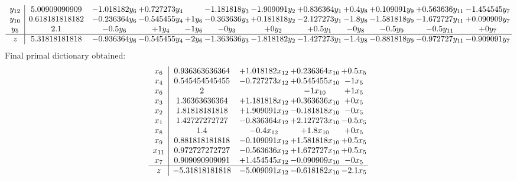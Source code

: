 \documentclass[11pt]{article}
\begin{document}
\[\begin{array}{c| c c@{\hskip 2pt} c@{\hskip 2pt} c@{\hskip 2pt} c@{\hskip 2pt} c@{\hskip 2pt} c@{\hskip 2pt} c@{\hskip 2pt} c@{\hskip 2pt} c@{\hskip 2pt} c@{\hskip 2pt} }
 y_{12}   &  5.00909090909 & -1.018182 y_{6} & + 0.727273 y_{4} &   & -1.181818 y_{3} & -1.909091 y_{2} & + 0.836364 y_{1} & + 0.4 y_{8} & + 0.109091 y_{9} & + 0.563636 y_{11} & -1.454545 y_{7}\\
 y_{10}   &  0.618181818182 & -0.236364 y_{6} & -0.545455 y_{4} & + 1 y_{6} & -0.363636 y_{3} & + 0.181818 y_{2} & -2.127273 y_{1} & -1.8 y_{8} & -1.581818 y_{9} & -1.672727 y_{11} & + 0.090909 y_{7}\\
 y_{5}   &  2.1 & -0.5 y_{6} & + 1 y_{4} & -1 y_{6} & -0 y_{3} & + 0 y_{2} & + 0.5 y_{1} & -0 y_{8} & -0.5 y_{9} & -0.5 y_{11} & + 0 y_{7}\\
\hline
z    &  5.31818181818 & -0.936364 y_{6} & -0.545455 y_{4} & -2 y_{6} & -1.363636 y_{3} & -1.818182 y_{2} & -1.427273 y_{1} & -1.4 y_{8} & -0.881818 y_{9} & -0.972727 y_{11} & -0.909091 y_{7}\\
\end{array}\]
 Final primal dictionary obtained: 
\[\begin{array}{c| c c@{\hskip 2pt} c@{\hskip 2pt} c@{\hskip 2pt} }
 x_{6}   &  0.936363636364 & + 1.018182 x_{12} & + 0.236364 x_{10} & + 0.5 x_{5}\\
 x_{4}   &  0.545454545455 & -0.727273 x_{12} & + 0.545455 x_{10} & -1 x_{5}\\
 x_{6}   &  2  &   & -1 x_{10} & + 1 x_{5}\\
 x_{3}   &  1.36363636364 & + 1.181818 x_{12} & + 0.363636 x_{10} & + 0 x_{5}\\
 x_{2}   &  1.81818181818 & + 1.909091 x_{12} & -0.181818 x_{10} & -0 x_{5}\\
 x_{1}   &  1.42727272727 & -0.836364 x_{12} & + 2.127273 x_{10} & -0.5 x_{5}\\
 x_{8}   &  1.4 & -0.4 x_{12} & + 1.8 x_{10} & + 0 x_{5}\\
 x_{9}   &  0.881818181818 & -0.109091 x_{12} & + 1.581818 x_{10} & + 0.5 x_{5}\\
 x_{11}   &  0.972727272727 & -0.563636 x_{12} & + 1.672727 x_{10} & + 0.5 x_{5}\\
 x_{7}   &  0.909090909091 & + 1.454545 x_{12} & -0.090909 x_{10} & -0 x_{5}\\
\hline
z    &  -5.31818181818 & -5.009091 x_{12} & -0.618182 x_{10} & -2.1 x_{5}\\
\end{array}\]
\end{document}
